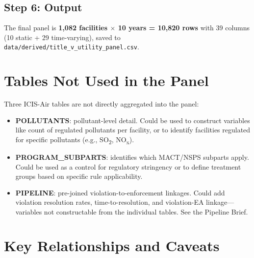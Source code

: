 \documentclass[11pt]{article}
\begin{document}
\subsection{Step 6: Output}

The final panel is \textbf{1,082 facilities $\times$ 10 years = 10,820 rows} with 39 columns (10 static + 29 time-varying), saved to \texttt{data/derived/title\_v\_utility\_panel.csv}.

\section{Tables Not Used in the Panel}

Three ICIS-Air tables are not directly aggregated into the panel:

\begin{itemize}[nosep]
  \item \textbf{POLLUTANTS}: pollutant-level detail. Could be used to construct variables like count of regulated pollutants per facility, or to identify facilities regulated for specific pollutants (e.g., SO\textsubscript{2}, NO\textsubscript{x}).
  \item \textbf{PROGRAM\_SUBPARTS}: identifies which MACT/NSPS subparts apply. Could be used as a control for regulatory stringency or to define treatment groups based on specific rule applicability.
  \item \textbf{PIPELINE}: pre-joined violation-to-enforcement linkages. Could add violation resolution rates, time-to-resolution, and violation-EA linkage---variables not constructable from the individual tables. See the Pipeline Brief.
\end{itemize}

\section{Key Relationships and Caveats}
\end{document}

